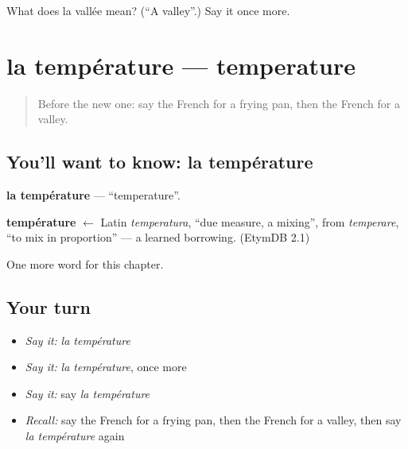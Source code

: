 \begin{tcolorbox}[breakable,colback=teal!4,colframe=teal!35!black,title={Before you move on}]
What does la vallée mean? (\textquotedblleft{}A valley\textquotedblright{}.) Say it once more.
\end{tcolorbox}
\section[la température]{la température — temperature}

\label{lesson:FR-C194-temperature}



\begin{quote}
Before the new one: say the French for a frying pan, then the French for a valley.
\end{quote}

\subsection*{You'll want to know: la température}
\textbf{la température} — \textquotedblleft{}temperature\textquotedblright{}.

\begin{cousinweb}
\textbf{température} $\leftarrow$ Latin \emph{temperatura}, \textquotedblleft{}due measure, a mixing\textquotedblright{}, from \emph{temperare}, \textquotedblleft{}to mix in proportion\textquotedblright{} — a learned borrowing. (EtymDB 2.1)
\end{cousinweb}

\begin{grammarlens}[title={What you've built}]
One more word for this chapter.
\end{grammarlens}

\subsection*{Your turn}
\begin{itemize}
\raggedright
  \item \emph{Say it:} \emph{la température}
  \item \emph{Say it:} \emph{la température}, once more
  \item \emph{Say it:} say \emph{la température}
  \item \emph{Recall:} say the French for a frying pan, then the French for a valley, then say \emph{la température} again
\end{itemize}

